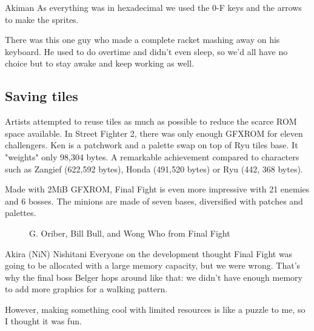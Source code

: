 \begin{q}{Akiman\cite{ar20160404}}
  As everything was in hexadecimal we used the 0-F keys and the arrows to make the sprites. 

  There was this one guy who made a complete racket mashing away on his keyboard. He used to do overtime and didn't even sleep, so we'd all have no choice but to stay awake and keep working as well.
\end{q}


\subsection{Saving tiles}
Artists attempted to reuse tiles as much as possible to reduce the scarce ROM space available. In Street Fighter 2, there was only enough GFXROM for eleven challengers. Ken is a patchwork and a palette swap on top of Ryu tiles base. It "weights" only 98,304 bytes. A remarkable achievement compared to characters such as Zangief (622,592 bytes), Honda (491,520 bytes) or Ryu (442, 368 bytes).

\begin{minipage}[t]{0.19\linewidth}
\end{minipage}%
\hfill%
\begin{minipage}[t]{0.19\linewidth}
\end{minipage}
\hfill%
\begin{minipage}[t]{0.19\linewidth}
\end{minipage}%
\hfill%
\begin{minipage}[t]{0.19\linewidth}
\end{minipage}
\hfill%
\begin{minipage}[t]{0.19\linewidth}
\end{minipage}


Made with 2MiB GFXROM, Final Fight is even more impressive with 21 enemies and 6 bosses. The minions are made of seven bases, diversified with patches and palettes.

\begin{figure}[H]
\caption*{G. Oriber, Bill Bull, and Wong Who from Final Fight}
\end{figure}


\begin{q}{Akira (NiN) Nishitani\cite{1991_retro}}
Everyone on the development thought Final Fight was going to be allocated with a large memory capacity, but we were wrong.
That's why the final boss Belger hops around like that: we didn't have enough memory to add more graphics for a walking pattern. 

However, making something cool with limited resources is like a puzzle to me, so I thought it was fun. 
\end{q}


